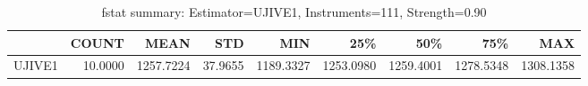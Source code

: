 \begin{table}[ht]
\centering
\caption{fstat summary: Estimator=UJIVE1, Instruments=111, Strength=0.90}
\begin{tabular}{lrrrrrrrr}
\toprule
 & COUNT & MEAN & STD & MIN & 25\% & 50\% & 75\% & MAX \\
\midrule
UJIVE1 & 10.0000 & 1257.7224 & 37.9655 & 1189.3327 & 1253.0980 & 1259.4001 & 1278.5348 & 1308.1358 \\
\bottomrule
\end{tabular}
\end{table}
